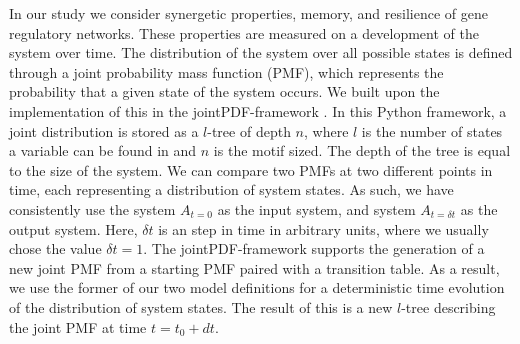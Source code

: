 \documentclass[../main.tex]{subfiles}
\begin{document}
In our study we consider synergetic properties, memory, and resilience of gene regulatory networks.
These properties are measured on a development of the system over time.
The distribution of the system over all possible states is defined through a joint probability mass function (PMF), which represents the probability that a given state of the system occurs.
We built upon the implementation of this in the jointPDF-framework \cite{jointpdf}.
In this Python framework, a joint distribution is stored as a $l$-tree of depth $n$, where $l$ is the number of states a variable can be found in and $n$ is the motif sized.
The depth of the tree is equal to the size of the system.
We can compare two PMFs at two different points in time, each representing a distribution of system states.
As such, we have consistently use the system $A_{t=0}$ as the input system, and system $A_{t=\delta t}$ as the output system.
Here, $\delta t$ is an step in time in arbitrary units, where we usually chose the value $\delta t = 1$. 
The jointPDF-framework supports the generation of a new joint PMF from a starting PMF paired with a transition table.
As a result, we use the former of our two model definitions for a deterministic time evolution of the distribution of system states.
The result of this is a new $l$-tree describing the joint PMF at time $t=t_0+dt$.
\end{document}
